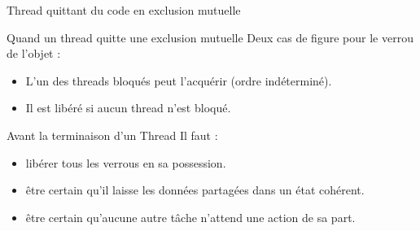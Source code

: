 
\begingroup

\begin{frame}{Thread quittant du code en exclusion mutuelle}
  
  \begin{block}{Quand un thread quitte une exclusion mutuelle}
    Deux cas de figure pour le verrou de l'objet :
    \begin{itemize}
    \item L'un  des threads  bloqués peut l'acquérir (ordre indéterminé).
    \item Il est libéré si aucun thread n'est bloqué.
    \end{itemize}
  \end{block}
  
  \bigskip
  
  \begin{alertblock}{Avant la terminaison d'un Thread}
    Il faut :
    \begin{itemize}
    \item \alert{libérer tous les verrous en sa possession.}
    \item être certain qu'il laisse les données partagées dans un état cohérent.
    \item être certain qu'aucune autre tâche n'attend une action de sa part.
    \end{itemize}
  \end{alertblock}

\end{frame}

\endgroup
\endinput
